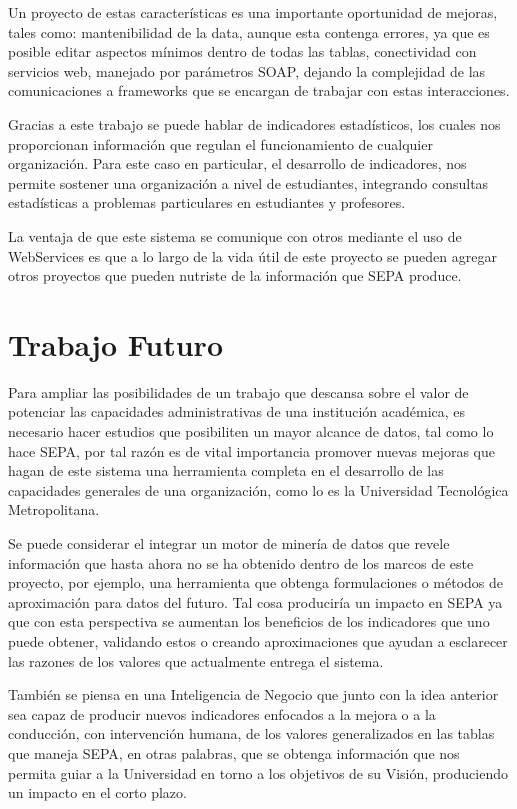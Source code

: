 \documentclass[a4paper,12pt,openany,oneside]{book}
\begin{document}
Un proyecto de estas características es una importante oportunidad de mejoras, tales como: mantenibilidad de la data, aunque esta contenga errores, ya que es posible editar aspectos mínimos dentro de todas las tablas, conectividad con servicios web, manejado por parámetros SOAP, dejando la complejidad de las comunicaciones a frameworks que se encargan de trabajar con estas interacciones.

Gracias a este trabajo se puede hablar de indicadores estadísticos, los cuales nos proporcionan información que regulan el funcionamiento de cualquier organización. Para este caso en particular, el desarrollo de indicadores, nos permite sostener una organización a nivel de estudiantes, integrando consultas estadísticas a problemas particulares en estudiantes y profesores.

La ventaja de que este sistema se comunique con otros mediante el uso de WebServices es que a lo largo de la vida útil de este proyecto se pueden agregar otros proyectos que pueden nutriste de la información que SEPA produce.
\section{Trabajo Futuro}
Para ampliar las posibilidades de un trabajo que descansa sobre el valor de potenciar las capacidades administrativas de una institución académica, es necesario hacer estudios que posibiliten un mayor alcance de datos, tal como lo hace SEPA, por tal razón es de vital importancia promover nuevas mejoras que hagan de este sistema una herramienta completa en el desarrollo de las capacidades generales de una organización, como lo es la Universidad Tecnológica Metropolitana.

Se puede considerar el integrar un motor de minería de datos que revele información que hasta ahora no se ha obtenido dentro de los marcos de este proyecto, por ejemplo, una herramienta que obtenga formulaciones o métodos de aproximación para datos del futuro. Tal cosa produciría un impacto en SEPA ya que con esta perspectiva se aumentan los beneficios de los indicadores que uno puede obtener, validando estos o creando aproximaciones que ayudan a esclarecer las razones de los valores que actualmente entrega el sistema.

También se piensa en una Inteligencia de Negocio que junto con la idea anterior sea capaz de producir nuevos indicadores enfocados a la mejora o a la conducción, con intervención humana, de los valores generalizados en las tablas que maneja SEPA, en otras palabras, que se obtenga información que nos permita guiar a la Universidad en torno a los objetivos de su Visión, produciendo un impacto en el corto plazo.
\end{document}

